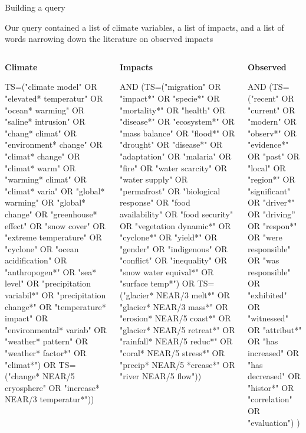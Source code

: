 \documentclass[9pt]{beamer}
\begin{document}
\begin{frame}{Building a query}
\begin{figure}
\end{figure}
\end{frame}

\begin{frame}{Our query contained a list of climate variables, a list of impacts, and a list of words narrowing down the literature on observed impacts}

\begin{columns}
	\begin{column}{0.33\linewidth}
		\textbf{Climate}
		
		\scriptsize
		
		TS=("climate model" OR "elevated* temperatur" OR "ocean* warming" OR "saline* intrusion" OR "chang* climat" OR "environment* change" OR "climat* change" OR "climat* warm" OR "warming* climat" OR "climat* varia" OR "global* warming" OR "global* change" OR "greenhouse* effect" OR "snow cover" OR "extreme temperature" OR "cyclone" OR "ocean acidification" OR "anthropogen*" OR "sea* level" OR "precipitation variabil*" OR "precipitation change*" OR "temperature* impact" OR "environmental* variab" OR "weather* pattern" OR "weather* factor*" OR "climat*") OR TS=("change* NEAR/5 cryosphere" OR "increase* NEAR/3 temperatur*")) 
		
	\end{column}
	\begin{column}{0.33\linewidth}
		
		\textbf{Impacts}
		
		\scriptsize
		
		AND (TS=("migration" OR "impact*" OR "specie*" OR "mortality*" OR "health" OR "disease*" OR "ecosystem*" OR "mass balance" OR "flood*" OR "drought" OR "disease*" OR "adaptation" OR "malaria" OR "fire" OR "water scarcity" OR "water supply" OR "permafrost" OR "biological response" OR "food availability" OR "food security" OR "vegetation dynamic*" OR "cyclone*" OR "yield*" OR "gender" OR "indigenous" OR "conflict" OR "inequality" OR "snow water equival*" OR "surface temp*") OR TS=("glacier* NEAR/3 melt*" OR "glacier* NEAR/3 mass*" OR "erosion* NEAR/5 coast*" OR "glacier* NEAR/5 retreat*" OR "rainfall* NEAR/5 reduc*" OR "coral* NEAR/5 stress*" OR "precip* NEAR/5 *crease*" OR "river NEAR/5 flow"))
		
	\end{column}
	\begin{column}{0.33\linewidth}
		
		\textbf{Observed}
		
		\scriptsize
		
		AND (TS=("recent" OR "current" OR "modern" OR "observ*" OR "evidence*" OR "past" OR "local" OR "region*" OR "significant" OR "driver*" OR "driving” OR "respon*" OR "were responsible" OR "was responsible" OR "exhibited" OR "witnessed" OR "attribut*" OR "has increased" OR "has decreased" OR "histor*" OR "correlation" OR "evaluation") )
	\end{column}	
\end{columns}

\end{frame}
\end{document}
